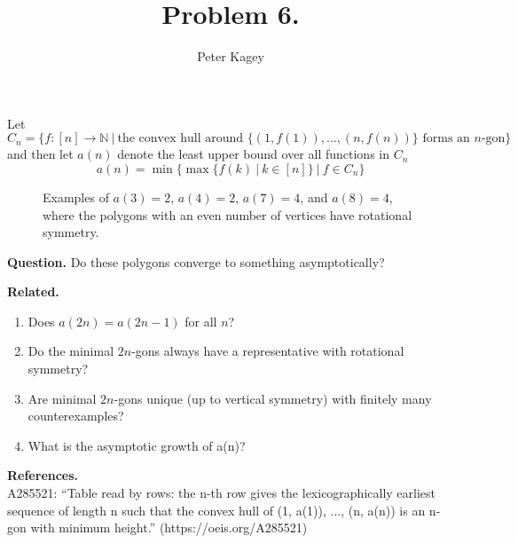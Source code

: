 \documentclass{article}
\newenvironment{question}{\begin{trivlist}\item[\textbf{Question.}]}{\end{trivlist}}
\newenvironment{references}{\begin{trivlist}\item[\textbf{References.}]}{\end{trivlist}}
\newenvironment{related}{\begin{trivlist}\item[\textbf{Related.}]\end{trivlist}\begin{enumerate}}{\end{enumerate}}
\begin{document}
\title{Problem 6.}
\date{}
\author{Peter Kagey}
\maketitle

  Let \[
    C_n = \{f: [n] \rightarrow \mathbb{N}\ |\ \text{the convex hull around } \{(1, f(1)), \hdots, (n, f(n))\} \text{ forms an } n\text{-gon}\}
  \] and then let $a(n)$ denote the least upper bound over all functions in $C_n$ \[
    a(n) = \min\{\max\{f(k)\ |\ k \in [n]\}\ |\ f \in C_n\}
  \]
\begin{figure}[!h]
  \centering
  \caption{Examples of $a(3) = 2$, $a(4) = 2$, $a(7) = 4$, and $a(8) = 4$, where
    the polygons with an even number of vertices have rotational symmetry.}
\end{figure}

\begin{question}
  Do these polygons converge to something asymptotically?
\end{question}

\begin{related}
  \item Does $a(2n) = a(2n - 1)$ for all $n$?
  \item Do the minimal $2n$-gons always have a representative with rotational
    symmetry?
  \item Are minimal $2n$-gons unique (up to vertical symmetry) with finitely
    many counterexamples?
  \item What is the asymptotic growth of a(n)?
\end{related}

\begin{references} \text{} \\
  A285521: ``Table read by rows: the n-th row gives the lexicographically earliest sequence of length n such that the convex hull of (1, a(1)), ..., (n, a(n)) is an n-gon with minimum height.'' (https://oeis.org/A285521)
\end{references}
\end{document}
